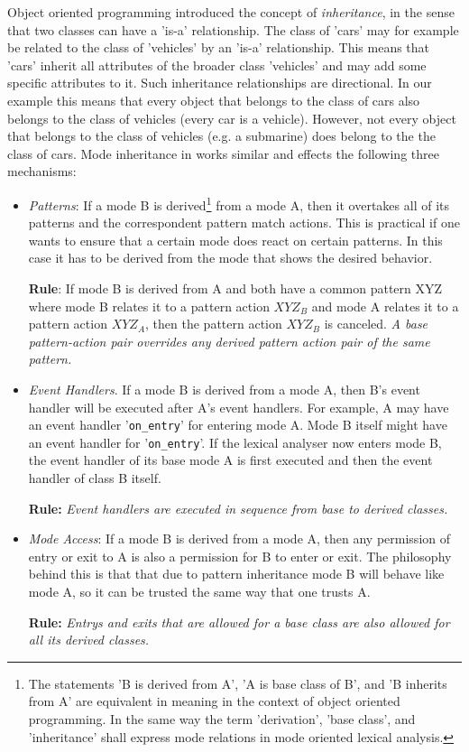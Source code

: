 Object oriented programming introduced the concept of {\it
inheritance}\cite{}, in the sense that two classes can have a 'is-a'
relationship. The class of 'cars' may for example be related to the class of
'vehicles' by an 'is-a' relationship. This means that 'cars' inherit all
attributes of the broader class 'vehicles' and may add some specific
attributes to it. Such inheritance relationships are directional. In our
example this means that every object that belongs to the class of cars also
belongs to the class of vehicles (every car is a vehicle). However, not every
object that belongs to the class of vehicles (e.g. a submarine) does belong to
the the class of cars. Mode inheritance in {\quex} works similar and effects
the following three mechanisms:

\begin{itemize}
\item {\it Patterns}: If a mode B is derived\footnote{The statements
    'B is derived from A', 'A is base class of B', and 'B inherits from A'
    are equivalent in meaning in the context of object oriented programming. 
    In the same way the term 'derivation', 'base class', and 'inheritance'
    shall express mode relations in mode oriented lexical analysis.}
  from a mode A, then it overtakes all of its patterns and the correspondent
  pattern match actions. This is practical if one wants to ensure that 
  a certain mode does react on certain patterns. In this case it has to be
    derived from the mode that shows the desired behavior. 
    
    {\bf Rule}: If mode B is derived from A and both have a common pattern
    {\sf XYZ} where mode B relates it to a pattern action $XYZ_B$ and mode A
    relates it to a pattern action $XYZ_A$, then the pattern action $XYZ_B$ is
    canceled. {\it A base pattern-action pair overrides any derived pattern
    action pair of the same pattern.} 

  
\item{\it Event Handlers}. If a mode B is derived from a mode A, then B's
  event handler will be executed after A's event handlers. For example, A may
  have an event handler '{\tt on\_entry}' for entering mode A. Mode B itself
  might have an event handler for '{\tt on\_entry}'. If the lexical analyser
  now enters mode B, the event handler of its base mode A is first executed
  and then the event handler of class B itself.
  
  {\bf Rule:} {\it Event handlers are executed in sequence from base to
    derived classes.}
  
\item{\it Mode Access}: If a mode B is derived from a mode A, then 
  any permission of entry or exit to A is also a permission for B to
  enter or exit. The philosophy behind this is that that due to pattern
  inheritance mode B will behave like mode A, so it can be trusted the same
  way that one trusts A. 

  {\bf Rule:} {\it Entrys and exits that are allowed for a base class
    are also allowed for all its derived classes.}
  
\end{itemize}

